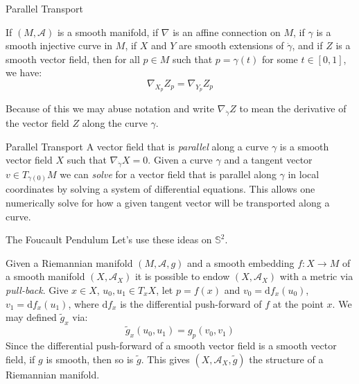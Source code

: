 \documentclass{beamer}
\begin{document}
    \begin{frame}{Parallel Transport}
        \begin{theorem}
            If $(M,\mathcal{A})$ is a smooth manifold, if $\nabla$ is an affine
            connection on $M$, if $\gamma$ is a smooth injective curve in $M$,
            if $X$ and $Y$ are smooth extensions of $\dot{\gamma}$, and if $Z$
            is a smooth vector field, then for all $p\in{M}$ such that
            $p=\gamma(t)$ for some $t\in[0,1]$, we have:
            \begin{equation}
                \nabla_{X_{p}}Z_{p}=\nabla_{Y_{p}}Z_{p}
            \end{equation}
        \end{theorem}
        Because of this we may abuse notation and write
        $\nabla_{\dot{\gamma}}Z$ to mean the derivative of the vector field $Z$
        along the curve $\gamma$.
    \end{frame}
    \begin{frame}{Parallel Transport}
        A vector field that is \textit{parallel} along a curve $\gamma$ is a
        smooth vector field $X$ such that $\nabla_{\dot{\gamma}}X=0$. Given a
        curve $\gamma$ and a tangent vector $v\in{T}_{\gamma(0)}M$ we can
        \textit{solve} for a vector field that is parallel along $\gamma$ in
        local coordinates by solving a system of differential equations. This
        allows one numerically solve for how a given tangent vector will be
        transported along a curve.
    \end{frame}
    \begin{frame}{The Foucault Pendulum}
        Let's use these ideas on $\mathbb{S}^{2}$.
        \par\hfill\par
        Given a Riemannian manifold $(M,\mathcal{A},g)$ and a smooth embedding
        $f:X\rightarrow{M}$ of a smooth manifold $(X,\mathcal{A}_{X})$ it is
        possible to endow $(X,\mathcal{A}_{X})$ with a metric via
        \textit{pull-back}. Give $x\in{X}$, $u_{0},u_{1}\in{T}_{x}X$, let
        $p=f(x)$ and $v_{0}=\textrm{d}f_{x}(u_{0})$,
        $v_{1}=\textrm{d}f_{x}(u_{1})$, where $\textrm{d}f_{x}$ is the
        differential push-forward of $f$ at the point $x$. We may defined
        $\tilde{g}_{x}$ via:
        \begin{equation}
            \tilde{g}_{x}(u_{0},u_{1})=g_{p}(v_{0},v_{1})
        \end{equation}
        Since the differential push-forward of a smooth vector field is a
        smooth vector field, if $g$ is smooth, then so is $\tilde{g}$. This
        gives $(X,\mathcal{A}_{X},\tilde{g})$ the structure of a Riemannian
        manifold.
    \end{frame}
\end{document}
